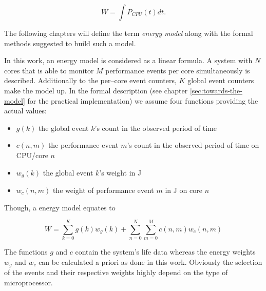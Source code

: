 \begin{equation}
  W = \int P_{CPU}(t)dt.
\end{equation}


\label{sec:model}

The following chapters will define the term \emph{energy model} along with  the
formal methods suggested to build such a model.


\label{sec:model-properties}

In this work, an energy model is considered as a linear formula. A system with
$N$ cores that is able to monitor $M$ performance events per core
simultaneously is described. Additionally to the per--core event counters, $K$
global event counters make the model up. In the formal description (see chapter
\ref{sec:towards-the-model} for the practical implementation) we assume four
functions providing the actual values:

\begin{itemize}

\item $g(k)$ the global event $k$'s count in the observed period of time

\item $c(n, m)$ the performance event $m$'s count in the observed period of time
      on CPU/core $n$

\item $w_g(k)$ the global event $k$'s weight in \si{\joule}

\item $w_c(n, m)$ the weight of performance event $m$ in \si{\joule} on core
$n$

\end{itemize}

Though, a energy model equates to

\begin{equation}
W = \sum\limits_{k=0}^K g(k) w_g(k) +
\sum\limits_{n=0}^N \sum\limits_{m=0}^M c(n, m) w_c(n,m)
\end{equation}

The functions $g$ and $c$ contain the system's life data whereas the energy
weights $w_g$ and $w_c$ can be calculated a priori as done in this work.
Obviously the selection of the events and their respective weights highly depend
on the type of microprocessor.


